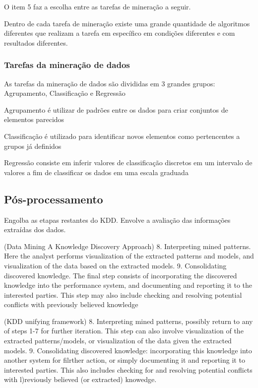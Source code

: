 O item 5 faz a escolha entre as tarefas de mineração a seguir.

Dentro de cada tarefa de mineração existe uma grande quantidade de algoritmos diferentes que realizam a tarefa em específico em condições diferentes e com resultados diferentes.

\subsubsection{Tarefas da mineração de dados}
\label{subsubsec:tarefasMineKDD}

As tarefas da mineração de dados são divididas em 3 grandes grupos: Agrupamento, Classificação e Regressão

Agrupamento é utilizar de padrões entre os dados para criar conjuntos de elementos parecidos

Classificação é utilizado para identificar novos elementos como pertencentes a grupos já definidos

Regressão consiste em inferir valores de classificação discretos em um intervalo de valores a fim de classificar os dados em uma escala graduada


\subsection{Pós-processamento}
\label{subsec:posprocKDD}

Engolba as etapas restantes do KDD. Envolve a avaliação das informações extraídas dos dados.

(Data Mining A Knowledge Discovery Approach)
8. Interpreting mined patterns. Here the analyst performs visualization of the extracted patterns and models, and visualization of the data based on the extracted models.
9. Consolidating discovered knowledge. The final step consists of incorporating the discovered knowledge into the performance system, and documenting and reporting it to the interested parties. This step may also include checking and resolving potential conflicts with previously believed knowledge

(KDD unifying framework)
8. Interpreting mined patterns, possibly return to any of steps 1-7 for further iteration. This step can also involve visualization of the extracted patterns/models, or visualization of the data given the extracted models.
9. Consolidating discovered knowledge: incorporating this knowledge into another system for filrther action, or simply documenting it and reporting it to interested parties. This also includes checking for and resolving potential conflicts with l)reviously believed (or extracted) knowedge.